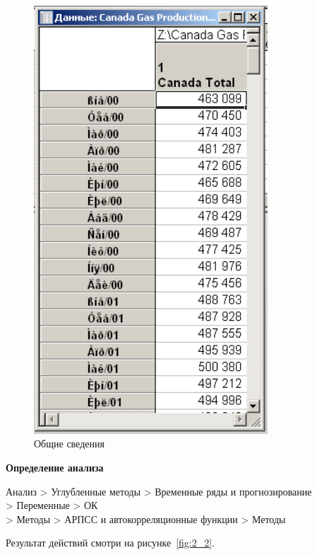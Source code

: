 \begin{figure}[!h]
  \centering

  \includegraphics[height=16cm]
  {inc/Canada_Gas_Production/1.PNG}

  \caption{Общие сведения}

  \label{fig:2_1}
\end{figure}

\newpage

\begin{center}
  \textbf{Определение анализа}
\end{center}

Анализ > Углубленные методы > Временные ряды и прогнозирование\\
> Переменные > ОК\\
> Методы > АРПСС и автокорреляционные функции > Методы

Результат действий смотри на рисунке~\ref{fig:2_2}.

